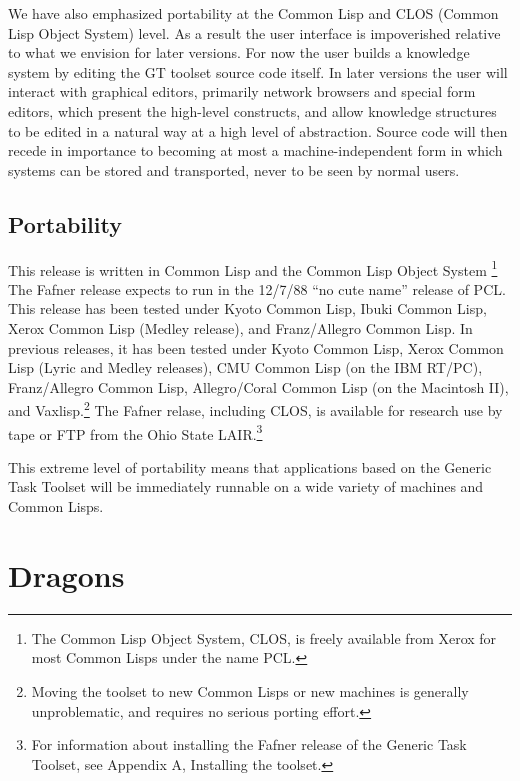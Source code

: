 We have also emphasized portability at the Common Lisp and CLOS
(Common Lisp Object System) level.  As a result the user interface is
impoverished relative to what we envision for later versions.  For now
the user builds a knowledge system by editing the GT toolset source
code itself.  In later versions the user will interact with graphical
editors, primarily network browsers and special form editors, which 
present the high-level constructs, and allow knowledge structures to
be edited in a natural way at a high level of abstraction.  Source
code will then recede in importance to becoming at most a
machine-independent form in which systems can be stored and
transported, never to be seen by normal users.



\section{Portability}

This release is written in Common Lisp and the Common Lisp Object System
\footnote{The Common Lisp Object System, CLOS, is freely available from
Xerox for most Common Lisps under the name PCL.} The Fafner release
expects to run in the 12/7/88 ``no cute name'' release of PCL.  This
release has been tested under Kyoto Common Lisp, Ibuki Common Lisp,
Xerox Common Lisp (Medley release), and Franz/Allegro Common Lisp. In
previous releases, it has been tested under Kyoto Common Lisp, Xerox
Common Lisp (Lyric and Medley releases), CMU Common Lisp (on the IBM
RT/PC), Franz/Allegro Common Lisp, Allegro/Coral Common Lisp (on the
Macintosh II), and Vaxlisp.\footnote{Moving the toolset to new Common
Lisps or new machines is generally unproblematic, and requires
no serious porting effort.} The Fafner relase, including
CLOS, is available for research use by tape or FTP from the Ohio State
LAIR.\footnote{For information about installing the Fafner release of
the Generic Task Toolset, see Appendix A, Installing the toolset.}

This extreme level of portability means that applications based on the
Generic Task Toolset will be immediately runnable on a wide variety of
machines and Common Lisps.





\chapter{Dragons} 


